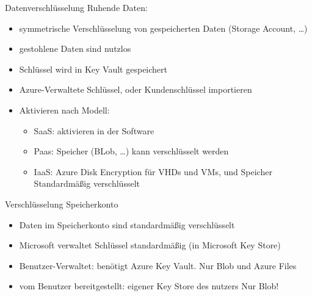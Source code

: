 

\begin{flashcard}[Definition]{Datenverschlüsselung}
    Ruhende Daten:
    \begin{itemize}
        \item symmetrische Verschlüsselung von gespeicherten Daten (Storage Account, \ldots)
        \item gestohlene Daten sind nutzlos
        \item Schlüssel wird in Key Vault gespeichert
        \item Azure-Verwaltete Schlüssel, oder Kundenschlüssel importieren
        \item Aktivieren nach Modell:
            \begin{itemize}
                \item SaaS: aktivieren in der Software
                \item Paas: Speicher (BLob, \ldots) kann verschlüsselt werden
                \item IaaS: Azure Disk Encryption für VHDs und VMs, und Speicher\newline
                    Standardmäßig verschlüsselt
            \end{itemize}
    \end{itemize}
\end{flashcard}

\begin{flashcard}[Definition]{Verschlüsselung Speicherkonto}
    \begin{itemize}
        \item Daten im Speicherkonto sind standardmäßig verschlüsselt
        \item Microsoft verwaltet Schlüssel standardmäßig (in Microsoft Key Store)
        \item Benutzer-Verwaltet: benötigt Azure Key Vault.\newline
            Nur Blob und Azure Files
        \item vom Benutzer bereitgestellt: eigener Key Store des nutzers\newline
            Nur Blob!
    \end{itemize}
\end{flashcard}

